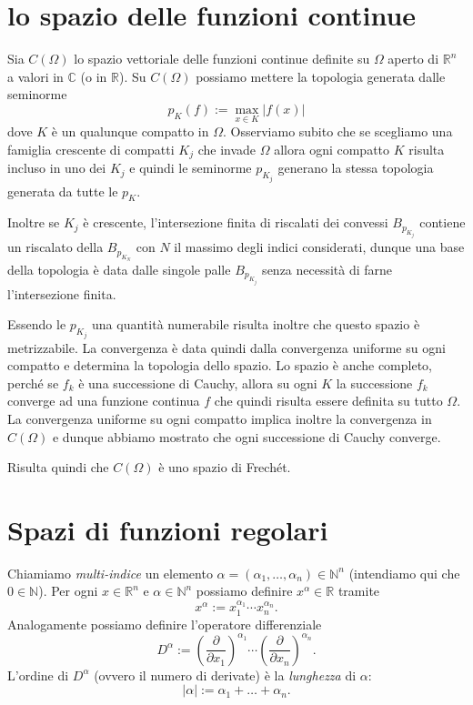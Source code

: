 \documentclass[italian,a4paper,oneside,headinclude]{scrbook}
\newcommand{\CC}{\mathbb C}
\newcommand{\NN}{\mathbb N}
\newcommand{\RR}{\mathbb R}
\newcommand{\abs}[1]{{\left|#1\right|}}
\newcommand{\defeq}{:=}
\begin{document}
\section{lo spazio delle funzioni continue}

Sia $C(\Omega)$ lo spazio vettoriale delle funzioni continue definite
su $\Omega$ aperto di $\RR^n$ a valori in $\CC$ (o in
$\RR$).
Su $C(\Omega)$ possiamo mettere la topologia generata dalle
seminorme
\[
p_K(f) \defeq \max_{x\in K} \abs{f(x)}
\]
dove $K$ è un qualunque compatto in $\Omega$.
Osserviamo subito che se scegliamo una famiglia crescente di compatti
$K_j$ che invade $\Omega$ allora ogni compatto $K$ risulta incluso in uno dei
$K_j$ e quindi le seminorme $p_{K_j}$ generano la stessa topologia
generata da tutte le $p_K$.

Inoltre se $K_j$ è crescente,
l'intersezione finita di riscalati dei convessi $B_{p_{K_j}}$
contiene un riscalato della $B_{p_{K_N}}$ con $N$ il massimo degli
indici considerati, dunque una base della topologia è data dalle
singole palle $B_{p_{K_j}}$ senza necessità di farne l'intersezione
finita.

Essendo le $p_{K_j}$ una quantità numerabile
risulta inoltre che questo spazio è metrizzabile.
La convergenza è data quindi dalla convergenza uniforme su ogni
compatto e determina la topologia dello spazio.
Lo spazio è anche
completo, perché se $f_k$ è una successione di Cauchy, allora su ogni
$K$ la successione $f_k$ converge ad una funzione continua $f$ che
quindi risulta essere definita su tutto $\Omega$. La convergenza
uniforme su ogni compatto implica inoltre la convergenza in $C(\Omega)$ e
dunque abbiamo mostrato che ogni successione di Cauchy converge.

Risulta quindi che $C(\Omega)$ è uno spazio di Frechét.

\section{Spazi di funzioni regolari}

Chiamiamo \emph{multi-indice} un elemento
$\alpha = (\alpha_1, \dots, \alpha_n) \in \NN^n$
(intendiamo qui che $0\in \NN$).
Per ogni $x\in \RR^n$ e $\alpha\in \NN^n$ possiamo definire $x^\alpha
\in \RR$ tramite
\[
  x^\alpha \defeq x_1^{\alpha_1}\cdots x_n^{\alpha_n}.
\]
Analogamente possiamo definire l'operatore differenziale
\[
D^\alpha \defeq \left(\frac{\partial}{\partial x_1}\right)^{\alpha_1}\!\!\cdots
\left(\frac{\partial}{\partial x_n}\right)^{\alpha_n}\!\!.
\]
L'ordine di $D^\alpha$ (ovvero il numero di derivate)
è la \emph{lunghezza} di $\alpha$:
\[
\abs{\alpha} \defeq \alpha_1 + \dots + \alpha_n.
\]
\end{document}

